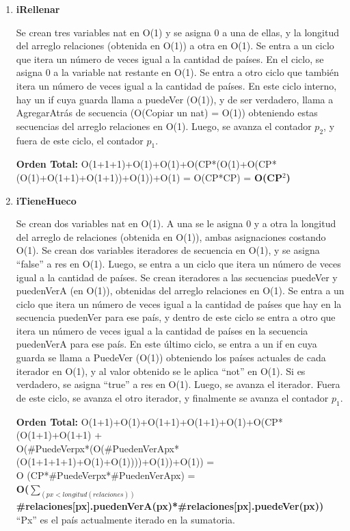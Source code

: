 \begin{enumerate}
\item\textbf{iRellenar}
\par Se crean tres variables nat en O(1) y se asigna 0 a una de ellas, y la longitud del arreglo relaciones (obtenida en O(1)) a otra en O(1). Se entra a un ciclo que itera un número de veces igual a la cantidad de países. En el ciclo, se asigna 0 a la variable nat restante en O(1). Se entra a otro ciclo que también itera un número de veces igual a la cantidad de países. En este ciclo interno, hay un if cuya guarda llama a puedeVer (O(1)), y de ser verdadero, llama a AgregarAtrás de secuencia (O(Copiar un nat) = O(1)) obteniendo estas secuencias del arreglo relaciones en O(1). Luego, se avanza el contador $p_2$, y fuera de este ciclo, el contador $p_1$.
\par\textbf{Orden Total:} O(1+1+1)+O(1)+O(1)+O(CP*(O(1)+O(CP*(O(1)+O(1+1)+O(1+1))+O(1))+O(1) = O(CP*CP) = \textbf{O(CP$^2$)}

\item\textbf{iTieneHueco}
\par Se crean dos variables nat en O(1). A una se le asigna 0 y a otra la longitud del arreglo de relaciones (obtenida en O(1)), ambas asignaciones costando O(1). Se crean dos variables iteradores de secuencia en O(1), y se asigna ``false'' a res en O(1). Luego, se entra a un ciclo que itera un número de veces igual a la cantidad de países. Se crean iteradores a las secuencias puedeVer y puedenVerA (en O(1)), obtenidas del arreglo relaciones en O(1). Se entra a un ciclo que itera un número de veces igual a la cantidad de países que hay en la secuencia puedenVer para ese país, y dentro de este ciclo se entra a otro que itera un número de veces igual a la cantidad de países en la secuencia puedenVerA para ese país. En este último ciclo, se entra a un if en cuya guarda se llama a PuedeVer (O(1)) obteniendo los países actuales de cada iterador en O(1), y al valor obtenido se le aplica ``not'' en O(1). Si es verdadero, se asigna ``true'' a res en O(1). Luego, se avanza el iterador. Fuera de este ciclo, se avanza el otro iterador, y finalmente se avanza el contador $p_1$.
\par\textbf{Orden Total:} O(1+1)+O(1)+O(1+1)+O(1+1)+O(1)+O(CP*(O(1+1)+O(1+1) +\\
O(\#PuedeVerpx*(O(\#PuedenVerApx*(O(1+1+1+1)+O(1)+O(1))))+O(1))+O(1)) =\\
O (CP*\#PuedeVerpx*\#PuedenVerApx) =\\ 
\textbf{O($\sum_{(px < longitud (relaciones))}$ \#relaciones[px].puedenVerA(px)*\#relaciones[px].puedeVer(px))}\\
``Px'' es el país actualmente iterado en la sumatoria.


\end{enumerate}
